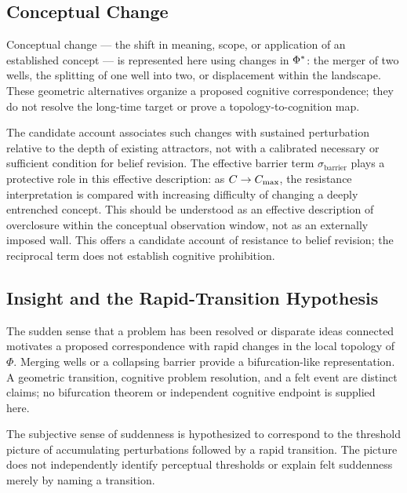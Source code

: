 \subsection{Conceptual Change}

Conceptual change --- the shift in meaning, scope, or application of
an established concept --- is represented here using changes in
$\Phi^{*}$: the merger of two wells, the splitting of one well into
two, or displacement within the landscape.
These geometric alternatives organize a proposed cognitive correspondence;
they do not resolve the long-time target or prove a topology-to-cognition map.

The candidate account associates such changes with sustained perturbation
relative to the depth of existing attractors, not with a calibrated
necessary or sufficient condition for belief revision.
The effective barrier term $\sigma_{\mathrm{barrier}}$ plays a
protective role in this effective description: as $C\to C_{\max}$,
the resistance interpretation is compared with increasing difficulty
of changing a deeply entrenched concept.
This should be understood as an effective description of overclosure
within the conceptual observation window, not as an externally imposed
wall.
This offers a candidate account of resistance to belief revision;
the reciprocal term does not establish cognitive prohibition.

\subsection{Insight and the Rapid-Transition Hypothesis}

The sudden sense that a problem has been resolved or disparate ideas
connected motivates a proposed correspondence with rapid changes in the
local topology of $\Phi$.
Merging wells or a collapsing barrier provide a bifurcation-like
representation. A geometric transition, cognitive problem resolution,
and a felt event are distinct claims; no bifurcation theorem or
independent cognitive endpoint is supplied here.

The subjective sense of suddenness is hypothesized to correspond to
the threshold picture of accumulating perturbations followed by a rapid
transition. The picture does not independently identify perceptual
thresholds or explain felt suddenness merely by naming a transition.
